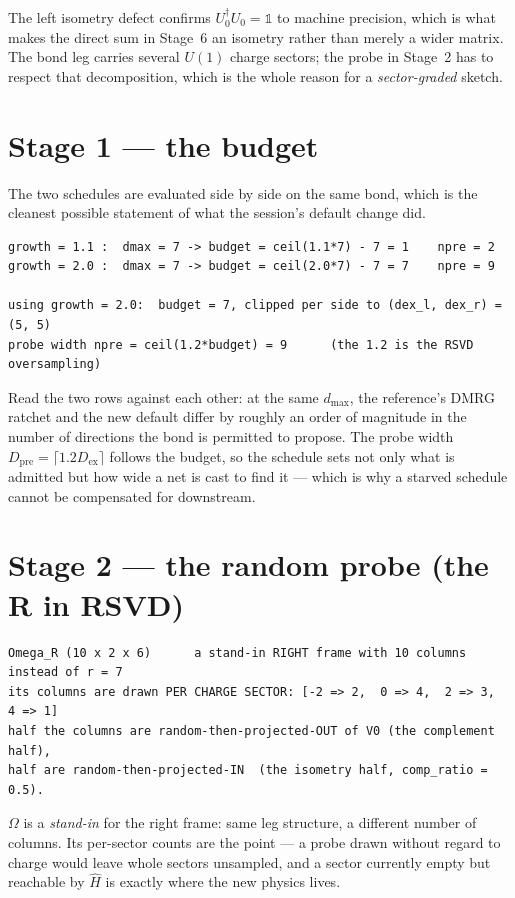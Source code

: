 \documentclass[11pt,a4paper]{article}
\newcommand{\Hb}{\hat{H}}
\newcommand{\Om}{\Omega}
\newcommand{\Dex}{D_{\mathrm{ex}}}
\newcommand{\Dpre}{D_{\mathrm{pre}}}
\begin{document}
\noindent
The left isometry defect confirms $U_0^\dagger U_0 = \mathbb{1}$ to machine precision, which is
what makes the direct sum in Stage~6 an isometry rather than merely a wider matrix. The bond leg
carries several $U(1)$ charge sectors; the probe in Stage~2 has to respect that decomposition,
which is the whole reason for a \emph{sector-graded} sketch.

\section{Stage 1 --- the budget}

The two schedules are evaluated side by side on the same bond, which is the cleanest possible
statement of what the session's default change did.

\begin{lstlisting}
growth = 1.1 :  dmax = 7 -> budget = ceil(1.1*7) - 7 = 1    npre = 2
growth = 2.0 :  dmax = 7 -> budget = ceil(2.0*7) - 7 = 7    npre = 9

using growth = 2.0:  budget = 7, clipped per side to (dex_l, dex_r) = (5, 5)
probe width npre = ceil(1.2*budget) = 9      (the 1.2 is the RSVD oversampling)
\end{lstlisting}

\noindent
Read the two rows against each other: at the same $d_{\max}$, the reference's DMRG ratchet and
the new default differ by roughly an order of magnitude in the number of directions the bond is
permitted to propose. The probe width $\Dpre = \lceil 1.2 \Dex\rceil$ follows the budget, so the
schedule sets not only what is admitted but how wide a net is cast to find it --- which is why a
starved schedule cannot be compensated for downstream.

\section{Stage 2 --- the random probe (the R in RSVD)}

\begin{lstlisting}
Omega_R (10 x 2 x 6)      a stand-in RIGHT frame with 10 columns instead of r = 7
its columns are drawn PER CHARGE SECTOR: [-2 => 2,  0 => 4,  2 => 3,  4 => 1]
half the columns are random-then-projected-OUT of V0 (the complement half),
half are random-then-projected-IN  (the isometry half, comp_ratio = 0.5).
\end{lstlisting}

\noindent
$\Om$ is a \emph{stand-in} for the right frame: same leg structure, a different number of
columns. Its per-sector counts are the point --- a probe drawn without regard to charge would
leave whole sectors unsampled, and a sector currently empty but reachable by $\Hb$ is exactly
where the new physics lives.
\end{document}
